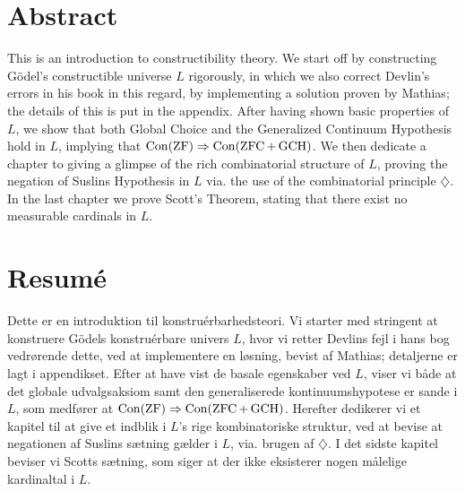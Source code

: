 \thispagestyle{fancy}
\setlength{\parindent}{18pt}

\begin{onehalfspacing}

\vspace*{75pt}

\section*{\huge Abstract}
This is an introduction to constructibility theory. We start off by constructing Gödel's constructible universe $L$ rigorously, in which we also correct Devlin's errors in his book in this regard, by implementing a solution proven by Mathias; the details of this is put in the appendix. After having shown basic properties of $L$, we show that both Global Choice and the Generalized Continuum Hypothesis hold in $L$, implying that $\operatorname{Con}(\operatorname{ZF})\Rightarrow\operatorname{Con}(\operatorname{ZFC}+\operatorname{GCH})$. We then dedicate a chapter to giving a glimpse of the rich combinatorial structure of $L$, proving the negation of Suslins Hypothesis in $L$ via. the use of the combinatorial principle $\diamondsuit$. In the last chapter we prove Scott's Theorem, stating that there exist no measurable cardinals in $L$.

\vspace*{75pt}

\section*{\huge Resumé}
Dette er en introduktion til konstruérbarhedsteori. Vi starter med stringent at konstruere Gödels konstruérbare univers $L$, hvor vi retter Devlins fejl i hans bog vedrørende dette, ved at implementere en løsning, bevist af Mathias; detaljerne er lagt i appendikset. Efter at have vist de basale egenskaber ved $L$, viser vi både at det globale udvalgsaksiom samt den generaliserede kontinuumshypotese er sande i $L$, som medfører at $\operatorname{Con}(\operatorname{ZF})\Rightarrow\operatorname{Con}(\operatorname{ZFC}+\operatorname{GCH})$. Herefter dedikerer vi et kapitel til at give et indblik i $L$'s rige kombinatoriske struktur, ved at bevise at negationen af Suslins sætning gælder i $L$, via. brugen af $\diamondsuit$. I det sidste kapitel beviser vi Scotts sætning, som siger at der ikke eksisterer nogen målelige kardinaltal i $L$.

\end{onehalfspacing}